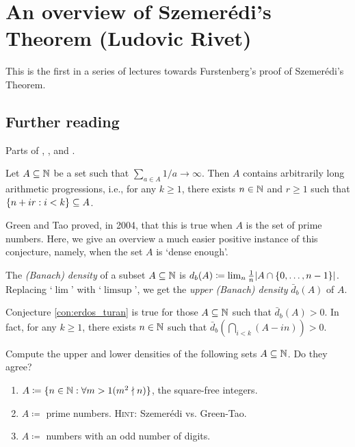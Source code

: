 \documentclass[reqno, twoside]{article}
\begin{document}
    \section{An overview of Szemerédi's Theorem (Ludovic Rivet)}\label{sec:6}

    This is the first in a series of lectures towards Furstenberg's proof of Szemerédi's Theorem.

    {\vspace{-0.1in}\small\subsection*{Further reading}Parts of \cite[Lectures 16 and 17]{Tse22}, \cite[Lecture 10]{Tao08}, and \cite[Section 7.2-7.3]{EW10}.}

    \begin{conjecture}\label{con:erdos_turan}
        Let $A\subseteq\mathbb{N}$ be a set such that $\sum_{a\in A}1/a\to\infty$. Then $A$ contains arbitrarily long arithmetic progressions, i.e., for any $k\geq1$, there exists $n\in\mathbb{N}$ and $r\geq1$ such that $\left\{n+ir: i<k\right\}\subseteq A$.
    \end{conjecture}

    Green and Tao proved, in 2004, that this is true when $A$ is the set of prime numbers. Here, we give an overview a much easier positive instance of this conjecture, namely, when the set $A$ is `dense enough'.

    \begin{definition}
        The \textit{(Banach) density} of a subset $A\subseteq\mathbb{N}$ is $d_b(A)\coloneqq\lim_n\frac{1}{n}|A\cap\left\{0,\dots,n-1\right\}\!|$. Replacing `$\lim$' with `$\limsup$', we get the \textit{upper (Banach) density} $\bar{d}_b(A)$ of $A$.
    \end{definition}

    \begin{theorem}[Szemerédi; 1975]\label{thm:szemeredi}
        Conjecture \ref{con:erdos_turan} is true for those $A\subseteq\mathbb{N}$ such that $\bar{d}_b(A)>0$. In fact, for any $k\geq1$, there exists $n\in\mathbb{N}$ such that $\bar{d}_b(\bigcap_{i<k}(A-in))>0$.
    \end{theorem}

    \begin{exercise}
        Compute the upper and lower densities of the following sets $A\subseteq\mathbb{N}$. Do they agree?
        \begin{enumerate}
            \item $A\coloneqq\{n\in\mathbb{N}:\forall m>1(m^2\nmid n)\}$, the square-free integers.
                \vspace{-0.05in}
            \item $A\coloneqq$ prime numbers. \textsc{Hint:} Szemerédi vs. Green-Tao.
                \vspace{-0.05in}
            \item $A\coloneqq$ numbers with an odd number of digits.
        \end{enumerate}
    \end{exercise}
\end{document}
